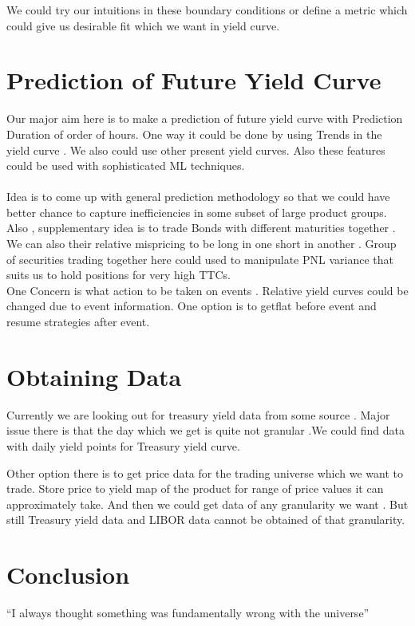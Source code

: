 \documentclass[a4paper]{article}
\begin{document}
  We could try our intuitions in these boundary conditions or define a metric which could give us desirable fit which we want in yield curve.
  
  
 \section{Prediction of Future Yield Curve}
 Our major aim here is to make a prediction of future yield curve with Prediction Duration of order of hours. One way it could be done by using Trends in the yield curve . We also could use other present yield curves. Also these features could be used with sophisticated ML techniques. \\ \\
 Idea is to come up with general prediction methodology so that we could have better chance to capture inefficiencies in some subset of large product groups. Also , supplementary idea is to trade Bonds with different maturities together . We can also their relative mispricing to be long in one short in another . Group of securities trading together here could used to manipulate PNL variance that suits us to hold positions for very high TTCs. \\
  One Concern is what action to be taken on events . Relative yield curves could be changed due to event information. One option is to getflat before event and resume strategies after event.
  
\section{Obtaining Data}
Currently we are looking out for treasury yield data from some source . Major issue there is that the day which we get is quite not granular .We could find data with daily yield points for Treasury yield curve.

Other option there is to get price data for the trading universe which we want to trade. 
Store price to yield map of the product for range of price values it can approximately take. And then we could get data of any granularity we want . But still Treasury yield data and LIBOR data cannot be obtained of that granularity.
 
 
 
\section{Conclusion}
``I always thought something was fundamentally wrong with the universe'' \citep{adams1995hitchhiker}
 
\end{document}
